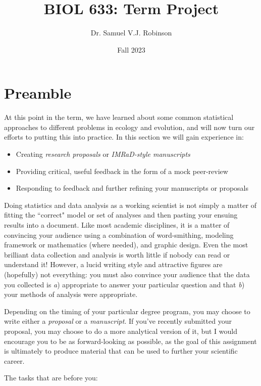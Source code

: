 \documentclass[11pt]{article}
\title{BIOL 633: Term Project}
\author{Dr. Samuel V.J. Robinson}
\date{Fall 2023}
\begin{document}
\maketitle

\section*{Preamble}

\large
At this point in the term, we have learned about some common statistical approaches to different problems in ecology and evolution, and will now turn our efforts to putting this into practice. In this section we will gain experience in: 

\begin{itemize}
\item Creating \emph{research proposals} or \emph{IMRaD-style manuscripts} 
\item Providing critical, useful feedback in the form of a mock peer-review
\item Responding to feedback and further refining your manuscripts or proposals
\end{itemize}

Doing statistics and data analysis as a working scientist is not simply a matter of fitting the ``correct" model or set of analyses and then pasting your ensuing results into a document. Like most academic disciplines, it is a matter of convincing your audience using a combination of word-smithing, modeling framework or mathematics (where needed), and graphic design. Even the most brilliant data collection and analysis is worth little if nobody can read or understand it! However, a lucid writing style and attractive figures are (hopefully) not everything: you must also convince your audience that the data you collected is \emph{a}) appropriate to answer your particular question and that \emph{b}) your methods of analysis were appropriate.

Depending on the timing of your particular degree program, you may choose to write either a \emph{proposal} or a \emph{manuscript}. If you've recently submitted your proposal, you may choose to do a more analytical version of it, but I would encourage you to be as forward-looking as possible, as the goal of this assignment is ultimately to produce material that can be used to further your scientific career.

The tasks that are before you:
\end{document}
